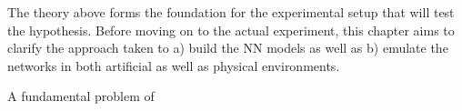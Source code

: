 \documentclass[report.tex]{subfiles}
\begin{document}

The theory above forms the foundation for the experimental setup that will
test the hypothesis.
Before moving on to the actual experiment, this chapter aims to clarify the
approach taken to a) build the \gls{NN} models as well as b) emulate the
networks in both artificial as well as physical environments.



A fundamental problem of
\end{document}

